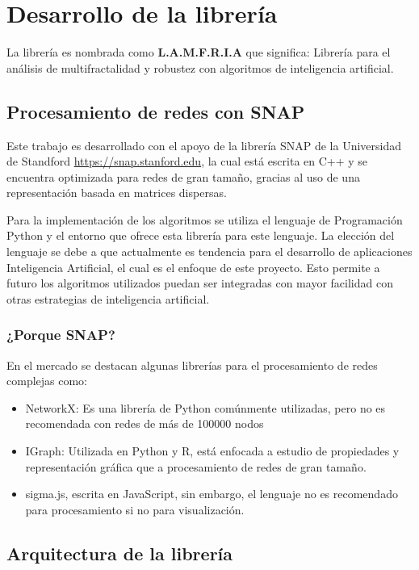 \section{Desarrollo de la librería}

La librería es nombrada como \textbf{L.A.M.F.R.I.A} que significa: Librería para el análisis de multifractalidad y robustez con algoritmos de inteligencia artificial.

\subsection{Procesamiento de redes con SNAP}

Este trabajo es desarrollado con el apoyo de la librería SNAP de la Universidad de Standford \url{https://snap.stanford.edu}, la cual está escrita en C++ y se encuentra optimizada para redes de gran tamaño, gracias al uso de una representación basada en matrices dispersas.

Para la implementación de los algoritmos se utiliza el lenguaje de Programación Python y el entorno que ofrece esta librería para este lenguaje. La elección del lenguaje se debe a que actualmente es tendencia para el desarrollo de aplicaciones Inteligencia Artificial, el cual es el enfoque de este proyecto. Esto permite a futuro los algoritmos utilizados puedan ser integradas con mayor facilidad con otras estrategias de inteligencia artificial.

\subsubsection{¿Porque SNAP?}

En el mercado se destacan algunas librerías para el procesamiento de redes complejas como:

\begin{itemize}
    \item NetworkX: Es una librería de Python comúnmente utilizadas, pero no es recomendada con redes de más de 100000 nodos
    \item IGraph: Utilizada en Python y R, está enfocada a estudio de propiedades y representación gráfica que a procesamiento de redes de gran tamaño.
    \item sigma.js, escrita en JavaScript, sin embargo, el lenguaje no es recomendado para procesamiento si no para visualización.
\end{itemize}


\subsection{Arquitectura de la librería}

